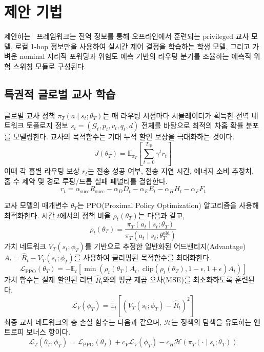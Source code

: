 \section{제안 기법}
\label{sec:제안기법}

제안하는 \method\ 프레임워크는 전역 정보를 통해 오프라인에서 훈련되는 privileged 교사 모델, 로컬 1-hop 정보만을 사용하여 실시간 제어 결정을 학습하는 학생 모델, 그리고 가벼운 nominal 지리적 포워딩과 위험도 예측 기반의 라우팅 분기를 조율하는 예측적 위험 스위칭 모듈로 구성된다.

\subsection{특권적 글로벌 교사 학습}
글로벌 교사 정책 $\pi_T(a \mid s_t; \theta_T)$는 매 라우팅 시점마다 시뮬레이터가 획득한 전역 네트워크 토폴로지 정보 $s_t = (\mathcal{G}_t, p_t, v_t, q_t, d)$ 전체를 바탕으로 최적의 차홉 확률 분포를 모델링한다. 교사의 목적함수는 기대 누적 할인 보상을 극대화하는 것이다.
\begin{equation}
    J(\theta_T) = \mathbb{E}_{\pi_T} \left[ \sum_{t=0}^{T_{\mathrm{ep}}} \gamma^t r_t \right]
\end{equation}
이때 각 홉별 라우팅 보상 $r_t$는 전송 성공 여부, 전송 지연 시간, 에너지 소비 추정치, 홉 수 제약 및 경로 루핑/드롭 실패 페널티를 결합한다.
\begin{equation}
    r_t = \alpha_{\mathrm{succ}}R_{\mathrm{succ}} - \alpha_D D_t - \alpha_E E_t - \alpha_H H_t - \alpha_F F_t
\end{equation}

교사 모델의 매개변수 $\theta_T$는 PPO(Proximal Policy Optimization) 알고리즘을 사용해 최적화한다. 시간 $t$에서의 정책 비율 $\rho_t(\theta_T)$는 다음과 같고,
\begin{equation}
    \rho_t(\theta_T) = \frac{\pi_T(a_t \mid s_t; \theta_T)}{\pi_T(a_t \mid s_t; \theta_T^{\mathrm{old}})}
\end{equation}
가치 네트워크 $V_T(s_t; \phi_T)$를 기반으로 추정한 일반화된 어드밴티지(Advantage) $A_t = \hat{R}_t - V_T(s_t; \phi_T)$를 사용하여 클리핑된 목적함수를 최대화한다.
\begin{equation}
    \mathcal{L}_{\mathrm{PPO}}(\theta_T) = - \mathbb{E}_t \left[ \min \left( \rho_t(\theta_T)A_t, \; \mathrm{clip}(\rho_t(\theta_T), 1-\epsilon, 1+\epsilon)A_t \right) \right]
\end{equation}
가치 함수는 실제 할인된 리턴 $\hat{R}_t$와의 평균 제곱 오차(MSE)를 최소화하도록 훈련된다.
\begin{equation}
    \mathcal{L}_{V}(\phi_T) = \mathbb{E}_t \left[ \left( V_T(s_t; \phi_T) - \hat{R}_t \right)^2 \right]
\end{equation}
최종 교사 네트워크의 총 손실 함수는 다음과 같으며, $\mathcal{H}$는 정책의 탐색을 유도하는 엔트로피 보너스 항이다.
\begin{equation}
    \mathcal{L}_{T}(\theta_T, \phi_T) = \mathcal{L}_{\mathrm{PPO}}(\theta_T) + c_V \mathcal{L}_{V}(\phi_T) - c_H \mathcal{H}(\pi_T(\cdot \mid s_t; \theta_T))
\end{equation}


